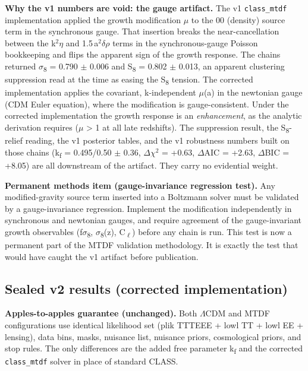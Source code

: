 \documentclass[11pt,a4paper]{article}
\begin{document}
\begin{mdframed}[linecolor=retire,linewidth=0.5pt,backgroundcolor=callout-bg,leftline=true,rightline=true,topline=true,bottomline=true,innerleftmargin=8pt,innerrightmargin=8pt,innertopmargin=6pt,innerbottommargin=6pt]
\textbf{Why the v1 numbers are void: the gauge artifact.}
The v1 \texttt{class\_\allowbreak{}mtdf} implementation applied the growth modification $\mu$ to the 00 (density) source term in the synchronous gauge. That insertion breaks the near-cancellation between the k$^{2}$$\eta$ and 1.5\,a$^{2}$$\delta$$\rho$ terms in the synchronous-gauge Poisson bookkeeping and flips the apparent sign of the growth response. The chains returned $\sigma$\textsubscript{8} = 0.790 $\pm$ 0.006 and S\textsubscript{8} = 0.802 $\pm$ 0.013, an apparent clustering suppression read at the time as easing the S\textsubscript{8} tension. The corrected implementation applies the covariant, k-independent $\mu$(a) in the newtonian gauge (CDM Euler equation), where the modification is gauge-consistent. Under the corrected implementation the growth response is an \emph{enhancement}, as the analytic derivation requires ($\mu$ > 1 at all late redshifts). The suppression result, the S\textsubscript{8}-relief reading, the v1 posterior tables, and the v1 robustness numbers built on those chains (k\textsubscript{f} = 0.495/\allowbreak{}0.50 $\pm$ 0.36, $\Delta$$\chi$$^{2}$ = +0.63, $\Delta$AIC = +2.63, $\Delta$BIC = +8.05) are all downstream of the artifact. They carry no evidential weight.

\textbf{Permanent methods item (gauge-invariance regression test).} Any modified-gravity source term inserted into a Boltzmann solver must be validated by a gauge-invariance regression. Implement the modification independently in synchronous and newtonian gauges, and require agreement of the gauge-invariant growth observables (f$\sigma$\textsubscript{8}, $\sigma$\textsubscript{8}(z), C\textsubscript{$\ell$}) before any chain is run. This test is now a permanent part of the MTDF validation methodology. It is exactly the test that would have caught the v1 artifact before publication.
\end{mdframed}

\subsection{Sealed v2 results (corrected implementation)}

\begin{mdframed}[linecolor=accent,linewidth=0.5pt,backgroundcolor=callout-bg,leftline=true,rightline=true,topline=true,bottomline=true,innerleftmargin=8pt,innerrightmargin=8pt,innertopmargin=6pt,innerbottommargin=6pt]
\textbf{Apples-to-apples guarantee (unchanged).}
Both $\Lambda$CDM and MTDF configurations use identical likelihood set (plik TTTEEE + lowl TT + lowl EE + lensing), data bins, masks, nuisance list, nuisance priors, cosmological priors, and stop rules. The only differences are the added free parameter k\textsubscript{f} and the corrected \texttt{class\_\allowbreak{}mtdf} solver in place of standard CLASS.
\end{mdframed}
\end{document}
